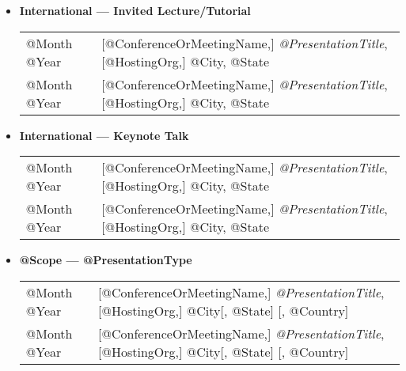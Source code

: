 \documentclass[10pt]{article}
\begin{document}
\begin{itemize}
\item[] \textbf{International --- Invited Lecture/Tutorial}
\\[1.3ex]
\begin{tabular}{l@{\quad\ }p{34em}} 
 @Month @Year 
 & [@ConferenceOrMeetingName,] \emph{@PresentationTitle},
   [@HostingOrg,]
   @City, @State
   \smallskip \\
 @Month @Year 
 & [@ConferenceOrMeetingName,] \emph{@PresentationTitle},
   [@HostingOrg,]
   @City, @State
\end{tabular}

\item[] \textbf{International --- Keynote Talk}
\\[1.3ex]
\begin{tabular}{l@{\quad\ }p{34em}} 
 @Month @Year 
 & [@ConferenceOrMeetingName,] \emph{@PresentationTitle},
   [@HostingOrg,]
   @City, @State
   \smallskip \\
 @Month @Year 
 & [@ConferenceOrMeetingName,] \emph{@PresentationTitle},
   [@HostingOrg,]
   @City, @State
\end{tabular}

%
\item[] \textbf{@Scope --- @PresentationType}
\\[1.3ex]
\begin{tabular}{l@{\quad\ }p{34em}} 
 @Month @Year 
 & [@ConferenceOrMeetingName,] \emph{@PresentationTitle},
   [@HostingOrg,]
   @City[, @State] [, @Country]
   \smallskip \\
 @Month @Year 
 & [@ConferenceOrMeetingName,] \emph{@PresentationTitle},
   [@HostingOrg,]
   @City[, @State] [, @Country]
   \smallskip \\
\end{tabular}
\end{itemize}


\section*{\service}

\end{document}
